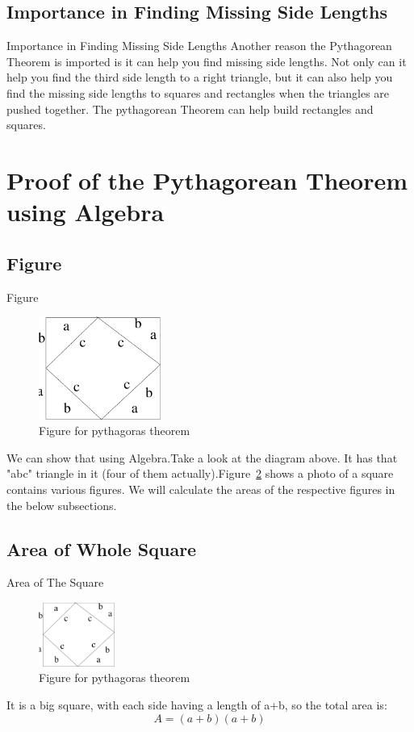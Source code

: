 \documentclass[10pt]{beamer}
\begin{document}
\subsection{Importance in Finding Missing Side Lengths}
\begin{frame}{Importance in Finding Missing Side Lengths}
\transfade
Another reason the Pythagorean Theorem is imported is it can help you find missing side lengths. Not only can it help you find the third side length to a right triangle, but it can also help you find the missing side lengths to squares and rectangles when the triangles are pushed together. The pythagorean Theorem can help build rectangles and squares.
\end{frame}

\section{Proof of the Pythagorean Theorem using Algebra}
\label{sec:proof}
\subsection{Figure}
\begin{frame}{Figure}
\begin{figure}[htb!]
  \begin{center}
    \includegraphics[width=40mm,scale=0.5 ]{fig9.eps}
   \end{center}
  \caption{Figure for pythagoras theorem}
  \label{image1}
\end{figure}
We can show that using Algebra.Take a look at the diagram above. It has that "abc" triangle in it (four of them actually).Figure~\ref{image1} shows a photo of a square contains various figures. We will calculate the areas of the respective figures in the below subsections.
\transfade
\end{frame}

\subsection{Area of Whole Square}
\label{a_square}
\begin{frame}{Area of The Square}
\begin{figure}[htb!]
  \begin{center}
    \includegraphics[width=25mm,scale=0.5 ]{fig9.eps}
   \end{center}
  \caption{Figure for pythagoras theorem}
  \label{image1}
\end{figure}
\transfade
It is a big square, with each side having a length of a+b, so the total area is:
$$A = (a+b)(a+b)$$
\end{frame}
\end{document}
